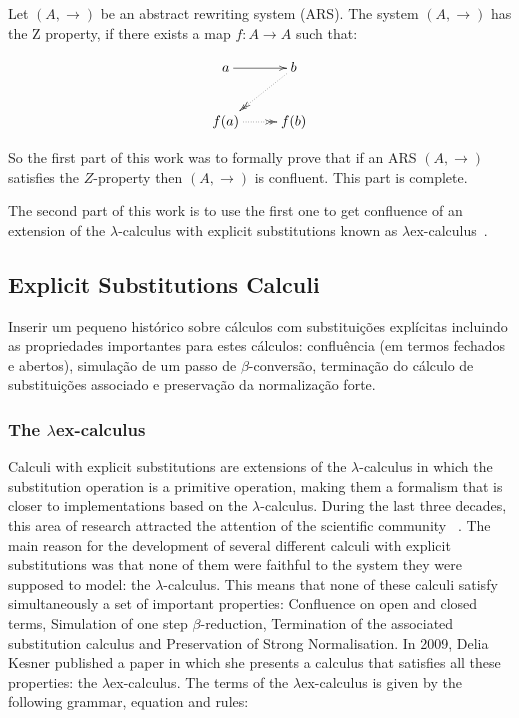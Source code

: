 \documentclass{llncs}
\newcommand{\flavio}[1]{{\color{red} #1}}
\begin{document}
\begin{definition}
      Let $(A,\to)$ be an abstract rewriting system (ARS). The system
    $(A,\to)$ has the Z property, if there exists a map $f:A \to A$
    such that:
    
    \[
      \xymatrix{
        a \ar[r] &  b \ar@{.>>}[dl]\\
        f(a) \ar@{.>>}[r] & f(b) \\ 
      }
    \]
\end{definition}

So the first part of this work was to formally prove that if an ARS $(A,\to)$ satisfies the $Z$-property then $(A,\to)$ is confluent. This part is complete. 

The second part of this work is to use the first one to get confluence of an extension of the $\lambda$-calculus with explicit substitutions known as $\lambda$ex-calculus~\cite{kes09}.

\subsection{Explicit Substitutions Calculi}

\flavio{Inserir um pequeno histórico sobre cálculos com substituições explícitas incluindo as propriedades importantes para estes cálculos: confluência (em termos fechados e abertos), simulação de um passo de $\beta$-conversão, terminação do cálculo de substituições associado e preservação da normalização forte.}

\subsubsection{The $\lambda$ex-calculus }


Calculi with explicit substitutions are extensions of the
$\lambda$-calculus in which the substitution operation is a primitive
operation, making them a formalism that is closer to implementations
based on the $\lambda$-calculus. During the last three decades, this
area of research attracted the attention of the scientific community
~\cite{Lins86,accl91,Bloo95,BeBrLeRD96,jfp,Munoz96,NaWi98,kes09}. The
main reason for the development of several different calculi with
explicit substitutions was that none of them were faithful to the
system they were supposed to model: the $\lambda$-calculus. This means
that none of these calculi satisfy simultaneously a set of important
properties: Confluence on open and closed terms, Simulation of one
step $\beta$-reduction, Termination of the associated substitution
calculus and Preservation of Strong Normalisation. In 2009, Delia
Kesner published a paper in which she presents a calculus that
satisfies all these properties: the $\lambda$ex-calculus. The terms of
the $\lambda$ex-calculus is given by the following grammar, equation and rules:
\end{document}

